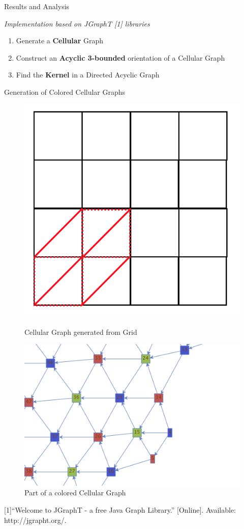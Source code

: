 \documentclass{beamer}
\begin{document}
\begin{frame}{Results and Analysis}

\small{\textit{Implementation based on JGraphT [1] libraries}}

\begin{block}{}

\begin{enumerate}
  \item Generate a \textbf{Cellular} Graph
  \item Construct an \textbf{Acyclic 3-bounded} orientation of a Cellular Graph
  \item Find the \textbf{Kernel} in a Directed Acyclic Graph
\end{enumerate}

\end{block}
\textrightarrow{}  Generation of Colored Cellular Graphs
\pause

\begin{figure}
\centering
\begin{minipage}{.5\textwidth}
  \centering
  \includegraphics[width=0.5\linewidth]{cellGeneration.png}
  \caption{Cellular Graph generated from Grid}
\end{minipage}%
\pause
\begin{minipage}{.5\textwidth}
  \centering
  \includegraphics[width=0.65\linewidth]{3colors.png}
  \caption{Part of a colored Cellular Graph}
\end{minipage}
\end{figure}

\scriptsize [1]“Welcome to JGraphT - a free Java Graph Library.” [Online]. Available: http://jgrapht.org/.
\end{frame}
\end{document}
